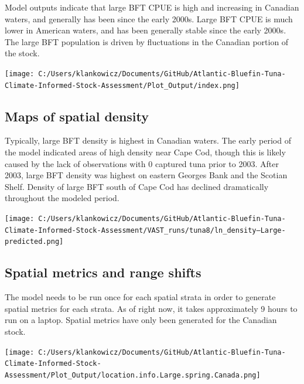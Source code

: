 \documentclass[
]{article}
\let\origfigure\figure
\let\endorigfigure\endfigure
\renewenvironment{figure}[1][2] {
    \expandafter\origfigure\expandafter[H]
} {
    \endorigfigure
}
\begin{document}
Model outputs indicate that large BFT CPUE is high and increasing in Canadian waters, and generally has been since the early 2000s. Large BFT CPUE is much lower in American waters, and has been generally stable since the early 2000s. The large BFT population is driven by fluctuations in the Canadian portion of the stock.

\begin{figure}
\centering
\texttt{[image: C:/Users/klankowicz/Documents/GitHub/Atlantic-Bluefin-Tuna-Climate-Informed-Stock-Assessment/Plot\_Output/index.png]}
\caption{Fig. 4: Joint indices of abundance}
\end{figure}

\newpage

\hypertarget{maps-of-spatial-density}{%
\subsection{Maps of spatial density}\label{maps-of-spatial-density}}

Typically, large BFT density is highest in Canadian waters. The early period of the model indicated areas of high density near Cape Cod, though this is likely caused by the lack of observations with 0 captured tuna prior to 2003. After 2003, large BFT density was highest on eastern Georges Bank and the Scotian Shelf. Density of large BFT south of Cape Cod has declined dramatically throughout the modeled period.

\begin{figure}
\centering
\texttt{[image: C:/Users/klankowicz/Documents/GitHub/Atlantic-Bluefin-Tuna-Climate-Informed-Stock-Assessment/VAST\_runs/tuna8/ln\_density--Large-predicted.png]}
\caption{Fig. 5: Large BFT spatio-temporal density}
\end{figure}

\newpage

\hypertarget{spatial-metrics-and-range-shifts}{%
\subsection{Spatial metrics and range shifts}\label{spatial-metrics-and-range-shifts}}

The model needs to be run once for each spatial strata in order to generate spatial metrics for each strata. As of right now, it takes approximately 9 hours to run on a laptop. Spatial metrics have only been generated for the Canadian stock.

\begin{figure}
\centering
\texttt{[image: C:/Users/klankowicz/Documents/GitHub/Atlantic-Bluefin-Tuna-Climate-Informed-Stock-Assessment/Plot\_Output/location.info.Large.spring.Canada.png]}
\caption{Fig. 6: Spatial metrics for large BFT in Canadian EEZ}
\end{figure}
\end{document}
